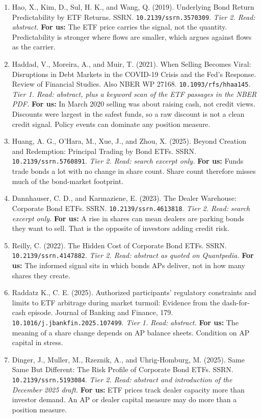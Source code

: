 \begin{enumerate}[leftmargin=*,itemsep=3pt]
\item Hao, X., Kim, D., Sul, H. K., and Wang, Q. (2019). Underlying Bond Return Predictability by ETF Returns. SSRN. \nolinkurl{10.2139/ssrn.3570309}. \emph{Tier 2. Read: abstract.} \textbf{For us:} The ETF price carries the signal, not the quantity. Predictability is stronger where flows are smaller, which argues against flows as the carrier.
\item Haddad, V., Moreira, A., and Muir, T. (2021). When Selling Becomes Viral: Disruptions in Debt Markets in the COVID-19 Crisis and the Fed's Response. Review of Financial Studies. Also NBER WP 27168. \nolinkurl{10.1093/rfs/hhaa145}. \emph{Tier 1. Read: abstract, plus a keyword scan of the ETF passages in the NBER PDF.} \textbf{For us:} In March 2020 selling was about raising cash, not credit views. Discounts were largest in the safest funds, so a raw discount is not a clean credit signal. Policy events can dominate any position measure.
\item Huang, A. G., O'Hara, M., Xue, J., and Zhou, X. (2025). Beyond Creation and Redemption: Principal Trading by Bond ETFs. SSRN. \nolinkurl{10.2139/ssrn.5760891}. \emph{Tier 2. Read: search excerpt only.} \textbf{For us:} Funds trade bonds a lot with no change in share count. Share count therefore misses much of the bond-market footprint.
\item Dannhauser, C. D., and Karmaziene, E. (2023). The Dealer Warehouse: Corporate Bond ETFs. SSRN. \nolinkurl{10.2139/ssrn.4613818}. \emph{Tier 2. Read: search excerpt only.} \textbf{For us:} A rise in shares can mean dealers are parking bonds they want to sell. That is the opposite of investors adding credit risk.
\item Reilly, C. (2022). The Hidden Cost of Corporate Bond ETFs. SSRN. \nolinkurl{10.2139/ssrn.4147882}. \emph{Tier 2. Read: abstract as quoted on Quantpedia.} \textbf{For us:} The informed signal sits in which bonds APs deliver, not in how many shares they create.
\item Raddatz K., C. E. (2025). Authorized participants' regulatory constraints and limits to ETF arbitrage during market turmoil: Evidence from the dash-for-cash episode. Journal of Banking and Finance, 179. \nolinkurl{10.1016/j.jbankfin.2025.107499}. \emph{Tier 1. Read: abstract.} \textbf{For us:} The meaning of a share change depends on AP balance sheets. Condition on AP capital in stress.
\item Dinger, J., Muller, M., Rzeznik, A., and Uhrig-Homburg, M. (2025). Same Same But Different: The Risk Profile of Corporate Bond ETFs. SSRN. \nolinkurl{10.2139/ssrn.5193084}. \emph{Tier 2. Read: abstract and introduction of the December 2025 draft.} \textbf{For us:} ETF prices track dealer capacity more than investor demand. An AP or dealer capital measure may do more than a position measure.

\end{enumerate}
